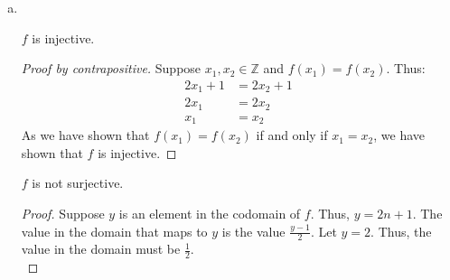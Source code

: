 \documentclass[11pt]{scrartcl}
\theoremstyle{dotlessP}
\theoremstyle{dotlessN}
\newcommand{\ints}{\mathbb{Z}}
\begin{document}
\begin{enumerate}[(a)]
	\item \ 
		\begin{claim*}
			$f$ is injective.
		\end{claim*}
		\begin{proof}
			[Proof by contrapositive]
			Suppose $x_1, x_2 \in \ints$ and $f(x_1) = f(x_2)$. Thus:
			\begin{align*}
				2x_1 + 1 &= 2x_2 + 1 \\
				2x_1 &= 2x_2 \\
				x_1 &= x_2
			\end{align*}
		As we have shown that $f(x_1) = f(x_2)$ if and only if $x_1 = x_2$, we have shown that $f$ is injective.
		\end{proof}
		\begin{claim*}
			$f$ is not surjective.
		\end{claim*}
		\begin{proof}
			Suppose $y$ is an element in the codomain of $f$. Thus, $y = 2n + 1$. The value in the domain that maps to $y$ is the value $\displaystyle\frac{y-1}{2}$. Let  $y = 2$. Thus, the value in the domain must be $\displaystyle\frac{1}{2}$. 
			\\


\end{proof}
\end{enumerate}
\end{document}
